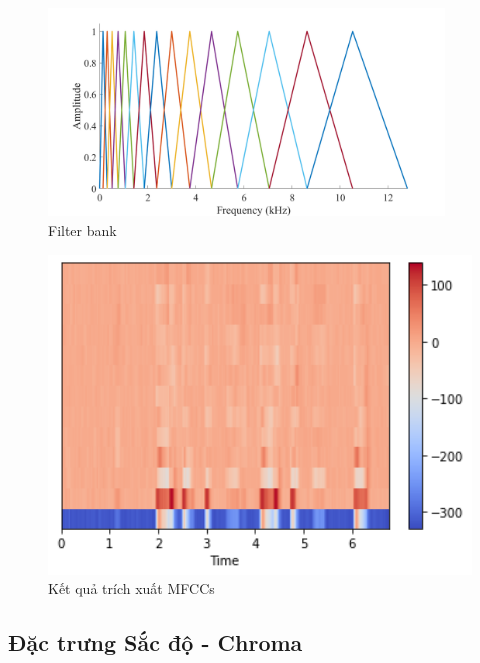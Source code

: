 \documentclass[a4paper, 12pt]{article}
\begin{document}
\begin{figure}[!h]
\captionsetup{width=0.8\textwidth}
\centering
\includegraphics[width=10.5cm]{images/4.5.png}
\caption{Filter bank}
\end{figure}

\begin{figure}[!h]
\captionsetup{width=0.8\textwidth}
\centering
\includegraphics[width=12cm]{images/4.3.png}
\caption{Kết quả trích xuất MFCCs}
\end{figure}


\subsection{ Đặc trưng Sắc độ - Chroma}
\end{document}
